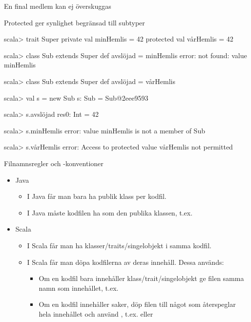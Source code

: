 \begin{Slide}{En final medlem kan ej överskuggas}
\vspace{-0.5em}
\end{Slide}


\begin{Slide}{Protected ger synlighet begränsad till subtyper}
\begin{REPL}
scala> trait Super {
         private val minHemlis = 42
         protected val vårHemlis = 42
       }

scala> class Sub extends Super { def avslöjad = minHemlis }
error: not found: value minHemlis

scala> class Sub extends Super { def avslöjad = vårHemlis }

scala> val s = new Sub
s: Sub = Sub@2eee9593

scala> s.avslöjad
res0: Int = 42

scala> s.minHemlis
error: value minHemlis is not a member of Sub

scala> s.vårHemlis
error: Access to protected value vårHemlis not permitted
\end{REPL}
\end{Slide}


\begin{Slide}{Filnamnsregler och -konventioner}
\begin{itemize}
\item Java
\begin{itemize}
\item I Java får man bara ha  publik klass per kodfil.
\item I Java måste kodfilen ha  som den publika klassen, t.ex. 
\end{itemize}
\item Scala
\begin{itemize}
\item I Scala får man ha  klasser/traits/singelobjekt i samma kodfil.
\item I Scala får man döpa kodfilerna  av deras innehåll. \pause Dessa  används:
\begin{itemize}
\item Om en kodfil bara innehåller  klass/trait/singelobjekt ge filen samma namn som innehållet, t.ex. 
\item Om en kodfil innehåller  saker, döp filen till något som återspeglar hela innehållet och använd , t.ex.  eller 
\end{itemize}


\end{itemize}

\end{itemize}
\end{Slide}


